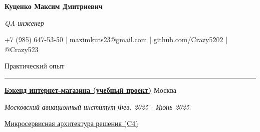 \documentclass[14pt, a4paper, oneside]{extarticle}
\begin{document}



\begin{center}
    \textbf{\LARGE Куценко Максим Дмитриевич}
    
    \textit{\Large QA-инженер}
\end{center}

\begin{center}
	\vspace{-0.5\intextsep}
	\small
    \faPhone* \space +7 (985) 647-53-50 | \faEnvelope \space maximkuts23@gmail.com | \faGithub \space github.com/Crazy5202 | \faTelegram \space @Crazy523
\end{center}


\begin{flushleft}
	\vspace{-\intextsep}
	\large Практический опыт
\end{flushleft}

\vspace{-0.8\intextsep}
\hrule


\begin{flushleft}
	\vspace{-0.8\intextsep}
	\quad
	\href{https://github.com/Crazy5202/eComm}{\textbf{Бэкенд интернет-магазина (учебный проект)}}
	\hfill
	Москва
\end{flushleft}

\begin{flushleft}
	\vspace{-1\intextsep}
	\quad
	\textit{Московский авиационный институт}
	\hfill
	\textit{\small Фев. 2025 - Июнь 2025}
\end{flushleft}


\vspace{-0.8\intextsep}

\href{https://github.com/Crazy5202/job_application_form/tree/main/portfolio/eComm_C4.pdf}{Микросервисная архитектура решения (C4)}
\end{document}
